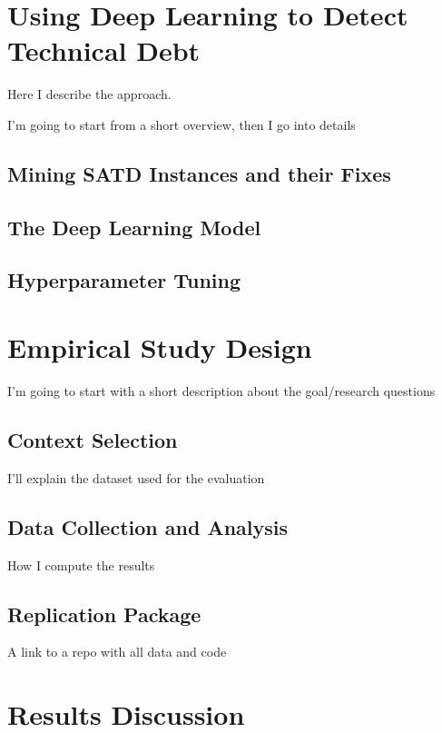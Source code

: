 \documentclass[11pt, mscthesis]{usiinfthesis}
\begin{document}
\chapter{Using Deep Learning to Detect Technical Debt}

Here I describe the approach. 

I'm going to start from a short overview, then I go into details

\section{Mining SATD Instances and their Fixes}
\lipsum[1-1]

\section{The Deep Learning Model}

\section{Hyperparameter Tuning}
\lipsum[1-1]

\chapter{Empirical Study Design}

I'm going to start with a short description  about the goal/research questions

\section{Context Selection}
I'll explain the dataset used for the evaluation
\lipsum[1-1]

\section{Data Collection and Analysis}
How I compute the results


\section{Replication Package}
A link to a repo with all data and code




\chapter{Results Discussion}
\end{document}
